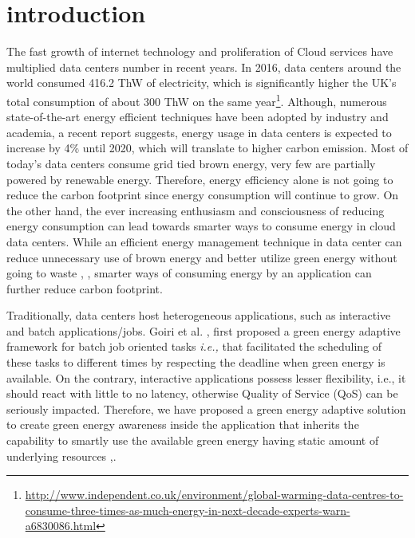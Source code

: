 \section{introduction}


The fast growth of internet technology and proliferation of Cloud services have multiplied data centers number in recent years. In 2016, data centers around the world consumed 416.2 ThW of electricity, which is significantly higher the UK's total consumption of about 300 ThW on the same year\footnote{\url{http://www.independent.co.uk/environment/global-warming-data-centres-to-consume-three-times-as-much-energy-in-next-decade-experts-warn-a6830086.html}}. Although, numerous state-of-the-art energy efficient techniques have been adopted by industry and academia, a recent report suggests, energy usage in data centers is expected to increase by 4\% until 2020, which will translate to higher carbon emission. Most of today's data centers consume grid tied brown energy, very few are partially powered by renewable energy. Therefore, energy efficiency alone is not going to reduce the
carbon footprint since energy consumption will continue to grow.
On the other hand, the ever increasing enthusiasm and consciousness of reducing energy consumption can lead towards smarter ways to consume energy in cloud data centers. While an efficient energy management technique in data center can reduce unnecessary use of brown energy and better utilize green energy without going to waste \cite{parasol}, \cite{sabbir}, smarter ways of consuming energy by an application can further reduce carbon footprint.

 


Traditionally, data centers host heterogeneous applications, such as interactive and batch applications/jobs. Goiri et al. \cite{GreenSlot}, \cite{GreenHadoop} first proposed a green energy adaptive framework for batch job oriented tasks \emph{i.e.,} that facilitated the scheduling of these tasks to different times by respecting the deadline when green energy is available. On the contrary, interactive
applications possess lesser flexibility, i.e., it should react with
little to no latency, otherwise Quality of Service (QoS) can
be seriously impacted. Therefore, we have proposed a green energy adaptive solution to create green energy awareness inside the application that inherits the capability to smartly use the available green energy having static amount of underlying resources \cite{cloudcom},\cite{tsc}.

